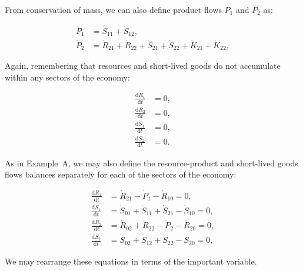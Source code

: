 


From conservation of mass,
we can also define product flows
$\dot{P}_{1}$ and $\dot{P}_{2}$ as:

\begin{align}
\label{eq:B_P1_def}
	\dot{P}_{1}				&
	= \dot{S}_{11}
	+ \dot{S}_{12},			\\
\label{eq:B_P2_def}
	\dot{P}_{2}				&
	= \dot{R}_{21}
	+ \dot{R}_{22}
	+ \dot{S}_{21}
	+ \dot{S}_{22}
	+ \dot{K}_{21}	 
	+ \dot{K}_{22},
\end{align}


\noindent Again, remembering that resources and short-lived
goods do not accumulate within any sectors of the economy:

\begin{align}\label{eq:dR_and_dS_zero}
	\frac{\mathrm{d}R_{1}}{\mathrm{d}t}			&
	= 0,																	\\
	\frac{\mathrm{d}R_{2}}{\mathrm{d}t} 			&
	= 0,																	\\
	\frac{\mathrm{d}S_{1}}{\mathrm{d}t} 			&
	= 0,																	\\
	\frac{\mathrm{d}S_{2}}{\mathrm{d}t} 			&
	= 0.
\end{align}

As in Example~A,
we may also define the resource-product
and short-lived goods flows balances separately
for each of the sectors of the economy:

\begin{align}
	\frac{\mathrm{d}R_{1}}{\mathrm{d}t} 	&
	= \dot{R}_{21}
	- \dot{P}_{1}
	- \dot{R}_{10}
	= 0,															\\
\label{eq:B_dS1}
	\frac{\mathrm{d}S_{1}}{\mathrm{d}t} 	&
	= \dot{S}_{01}
	+ \dot{S}_{11}
	+ \dot{S}_{21}
	- \dot{S}_{10}
	= 0,															\\
	\frac{\mathrm{d}R_{2}}{\mathrm{d}t} 	&
	= \dot{R}_{02}
	+ \dot{R}_{22}
	- \dot{P}_{2}
	- \dot{R}_{20}
	= 0,															\\
\label{eq:B_dS2}
	\frac{\mathrm{d}S_{2}}{\mathrm{d}t} 	&
	= \dot{S}_{02}
	+ \dot{S}_{12}
	+ \dot{S}_{22}
	- \dot{S}_{20}
	= 0,
\end{align}

We may rearrange these equations in terms of
the important variable.

